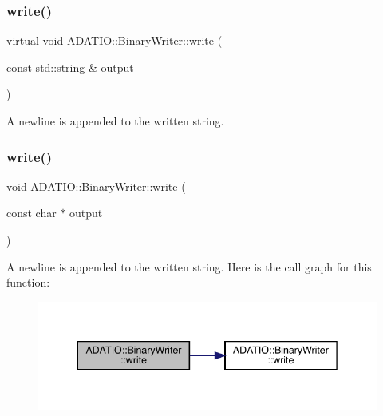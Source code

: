 \subsubsection{\texorpdfstring{write()}{write()}\hspace{0.1cm}{\footnotesize\ttfamily [2/24]}}
{\footnotesize\ttfamily virtual void A\+D\+A\+T\+I\+O\+::\+Binary\+Writer\+::write (\begin{DoxyParamCaption}\item[{const std\+::string \&}]{output }\end{DoxyParamCaption})\hspace{0.3cm}{\ttfamily [virtual]}}

A newline is appended to the written string. \mbox{\label{classADATIO_1_1BinaryWriter_a124ca67335cb24b5da69258dcd330b50}} 
\subsubsection{\texorpdfstring{write()}{write()}\hspace{0.1cm}{\footnotesize\ttfamily [3/24]}}
{\footnotesize\ttfamily void A\+D\+A\+T\+I\+O\+::\+Binary\+Writer\+::write (\begin{DoxyParamCaption}\item[{const char $\ast$}]{output }\end{DoxyParamCaption})\hspace{0.3cm}{\ttfamily [virtual]}}

A newline is appended to the written string. Here is the call graph for this function\+:\nopagebreak
\begin{figure}[H]
\begin{center}
\leavevmode
\includegraphics[width=342pt]{db/dee/classADATIO_1_1BinaryWriter_a124ca67335cb24b5da69258dcd330b50_cgraph}
\end{center}
\end{figure}
\mbox{\label{classADATIO_1_1BinaryWriter_add59d41e33f9b8c1ef59247c8bf59084}} 
